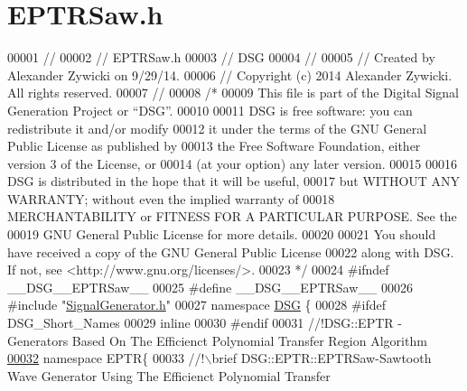 \hypertarget{_e_p_t_r_saw_8h_source}{\section{E\+P\+T\+R\+Saw.\+h}
\label{_e_p_t_r_saw_8h_source}
}

\begin{DoxyCode}
00001 \textcolor{comment}{//}
00002 \textcolor{comment}{//  EPTRSaw.h}
00003 \textcolor{comment}{//  DSG}
00004 \textcolor{comment}{//}
00005 \textcolor{comment}{//  Created by Alexander Zywicki on 9/29/14.}
00006 \textcolor{comment}{//  Copyright (c) 2014 Alexander Zywicki. All rights reserved.}
00007 \textcolor{comment}{//}
00008 \textcolor{comment}{/*}
00009 \textcolor{comment}{ This file is part of the Digital Signal Generation Project or “DSG”.}
00010 \textcolor{comment}{}
00011 \textcolor{comment}{ DSG is free software: you can redistribute it and/or modify}
00012 \textcolor{comment}{ it under the terms of the GNU General Public License as published by}
00013 \textcolor{comment}{ the Free Software Foundation, either version 3 of the License, or}
00014 \textcolor{comment}{ (at your option) any later version.}
00015 \textcolor{comment}{}
00016 \textcolor{comment}{ DSG is distributed in the hope that it will be useful,}
00017 \textcolor{comment}{ but WITHOUT ANY WARRANTY; without even the implied warranty of}
00018 \textcolor{comment}{ MERCHANTABILITY or FITNESS FOR A PARTICULAR PURPOSE.  See the}
00019 \textcolor{comment}{ GNU General Public License for more details.}
00020 \textcolor{comment}{}
00021 \textcolor{comment}{ You should have received a copy of the GNU General Public License}
00022 \textcolor{comment}{ along with DSG.  If not, see <http://www.gnu.org/licenses/>.}
00023 \textcolor{comment}{ */}
00024 \textcolor{preprocessor}{#ifndef \_\_DSG\_\_EPTRSaw\_\_}
00025 \textcolor{preprocessor}{#define \_\_DSG\_\_EPTRSaw\_\_}
00026 \textcolor{preprocessor}{#include "\hyperlink{_signal_generator_8h}{SignalGenerator.h}"}
00027 \textcolor{keyword}{namespace }\hyperlink{namespace_d_s_g}{DSG} \{
00028 \textcolor{preprocessor}{#ifdef DSG\_Short\_Names}
00029     \textcolor{keyword}{inline}
00030 \textcolor{preprocessor}{#endif}
00031 \textcolor{comment}{    //!DSG::EPTR - Generators Based On The Efficienct Polynomial Transfer Region Algorithm}
\hypertarget{_e_p_t_r_saw_8h_source_l00032}{}\hyperlink{namespace_d_s_g_1_1_e_p_t_r}{00032} \textcolor{comment}{}    \textcolor{keyword}{namespace }EPTR\{\textcolor{comment}{}
00033 \textcolor{comment}{        //!\(\backslash\)brief DSG::EPTR::EPTRSaw-Sawtooth Wave Generator Using The Efficienct Polynomial Transfer
}
\end{DoxyCode}
